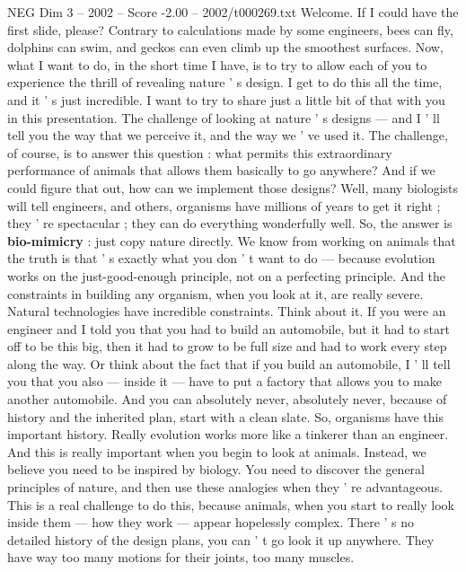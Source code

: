 \begin{textsample}{NEG Dim 3 – 2002 – Score -2.00 – 2002/t000269.txt}  \label{ex:f3_neg_007}
Welcome.
If I could have the first slide, please?
Contrary to calculations made by some engineers, bees can fly, dolphins can swim, and geckos can even climb up the smoothest surfaces.
Now, what I want to do, in the short time I have, is to try to allow each of you to experience the thrill of revealing nature ' s design.
I get to do this all the time, and it ' s just incredible.
I want to try to share just a little bit of that with you in this presentation.
The challenge of looking at nature ' s designs — and I ' ll tell you the way that we perceive it, and the way we ' ve used it.
The challenge, of course, is to answer this question : what permits this extraordinary performance of animals that allows them basically to go anywhere?
And if we could figure that out, how can we implement those designs?
Well, many biologists will tell engineers, and others, organisms have millions of years to get it right ; they ' re spectacular ; they can do everything wonderfully well.
So, the answer is \textbf{bio-mimicry} : just copy nature directly.
We know from working on animals that the truth is that ' s exactly what you don ' t want to do — because evolution works on the just-good-enough principle, not on a perfecting principle.
And the constraints in building any organism, when you look at it, are really severe.
Natural technologies have incredible constraints.
Think about it.
If you were an engineer and I told you that you had to build an automobile, but it had to start off to be this big, then it had to grow to be full size and had to work every step along the way.
Or think about the fact that if you build an automobile, I ' ll tell you that you also — inside it — have to put a factory that allows you to make another automobile.
And you can absolutely never, absolutely never, because of history and the inherited plan, start with a clean slate.
So, organisms have this important history.
Really evolution works more like a tinkerer than an engineer.
And this is really important when you begin to look at animals.
Instead, we believe you need to be inspired by biology.
You need to discover the general principles of nature, and then use these analogies when they ' re advantageous.
This is a real challenge to do this, because animals, when you start to really look inside them — how they work — appear hopelessly complex.
There ' s no detailed history of the design plans, you can ' t go look it up anywhere.
They have way too many motions for their joints, too many muscles.

\end{textsample}
